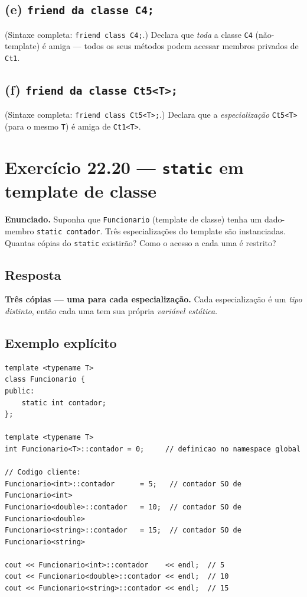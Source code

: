 \documentclass[11pt,a4paper]{article}
\begin{document}
\subsection*{(e) \texttt{friend da classe C4;}} 

(Sintaxe completa: \texttt{friend class C4;}.) Declara que \emph{toda} a classe \texttt{C4} (n\~ao-template) \'e amiga --- todos os seus m\'etodos podem acessar membros privados de \texttt{Ct1}.

\subsection*{(f) \texttt{friend da classe Ct5<T>;}}

(Sintaxe completa: \texttt{friend class Ct5<T>;}.) Declara que a \emph{especializa\c{c}\~ao} \texttt{Ct5<T>} (para o mesmo \texttt{T}) \'e amiga de \texttt{Ct1<T>}.

\section{Exerc\'icio 22.20 --- \texttt{static} em template de classe}

\begin{enunciado}
\textbf{Enunciado.} Suponha que \texttt{Funcionario} (template de classe) tenha um dado-membro \texttt{static contador}. Tr\^es especializa\c{c}\~oes do template s\~ao instanciadas. Quantas c\'opias do \texttt{static} existir\~ao? Como o acesso a cada uma \'e restrito?
\end{enunciado}

\subsection*{Resposta}

\textbf{Tr\^es c\'opias --- uma para cada especializa\c{c}\~ao.} Cada especializa\c{c}\~ao \'e um \emph{tipo distinto}, ent\~ao cada uma tem sua pr\'opria \emph{vari\'avel est\'atica}.

\subsection*{Exemplo expl\'icito}

\begin{lstlisting}[style=cppcode,numbers=none]
template <typename T>
class Funcionario {
public:
    static int contador;
};

template <typename T>
int Funcionario<T>::contador = 0;     // definicao no namespace global

// Codigo cliente:
Funcionario<int>::contador      = 5;   // contador SO de Funcionario<int>
Funcionario<double>::contador   = 10;  // contador SO de Funcionario<double>
Funcionario<string>::contador   = 15;  // contador SO de Funcionario<string>

cout << Funcionario<int>::contador    << endl;  // 5
cout << Funcionario<double>::contador << endl;  // 10
cout << Funcionario<string>::contador << endl;  // 15
\end{lstlisting}
\end{document}

